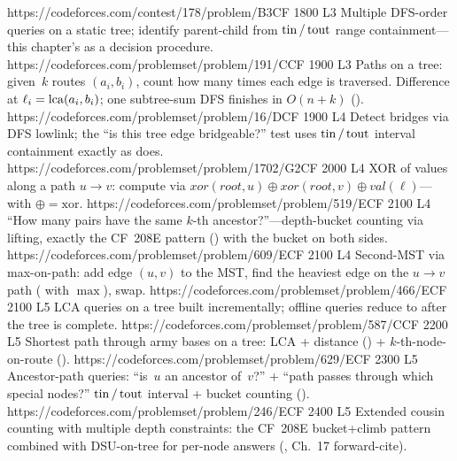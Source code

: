 \begin{mixedset}
    {https://codeforces.com/contest/178/problem/B3}{CF 1800 L3}
    {Multiple DFS-order queries on a static tree; identify parent-child
     from \(\operatorname{tin}/\operatorname{tout}\) range containment---this chapter's
      as a decision procedure.}
    {https://codeforces.com/problemset/problem/191/C}{CF 1900 L3}
    {Paths on a tree: given~\(k\) routes \((a_i,b_i)\), count how many
     times each edge is traversed. Difference at \(\ell_i = \operatorname{lca}(a_i,b_i)\);
     one subtree-sum DFS finishes in \(O(n{+}k)\)
     ().}
    {https://codeforces.com/problemset/problem/16/D}{CF 1900 L4}
    {Detect bridges via DFS lowlink; the ``is this tree edge
     bridgeable?'' test uses \(\operatorname{tin}/\operatorname{tout}\) interval containment
     exactly as  does.}
    {https://codeforces.com/problemset/problem/1702/G2}{CF 2000 L4}
    {XOR of values along a path \(u \to v\): compute via
     \(\mathit{xor}(\mathit{root},u) \oplus
     \mathit{xor}(\mathit{root},v) \oplus \mathit{val}(\ell)\)---
      with \(\oplus = \mathrm{xor}\).}
    {https://codeforces.com/problemset/problem/519/E}{CF 2100 L4}
    {``How many pairs have the same \(k\)-th ancestor?''---depth-bucket
     counting via lifting, exactly the CF~208E pattern
     () with the bucket on both sides.}
    {https://codeforces.com/problemset/problem/609/E}{CF 2100 L4}
    {Second-MST via max-on-path: add edge \((u,v)\) to the MST, find
     the heaviest edge on the \(u \to v\) path ( with
     \(\max\)), swap.}
    {https://codeforces.com/problemset/problem/466/E}{CF 2100 L5}
    {LCA queries on a tree built incrementally; offline queries reduce
     to  after the tree is complete.}
    {https://codeforces.com/problemset/problem/587/C}{CF 2200 L5}
    {Shortest path through army bases on a tree: LCA + distance
     () + \(k\)-th-node-on-route
     ().}
    {https://codeforces.com/problemset/problem/629/E}{CF 2300 L5}
    {Ancestor-path queries: ``is~\(u\) an ancestor of~\(v\)?'' +
     ``path passes through which special nodes?''
     \(\operatorname{tin}/\operatorname{tout}\) interval + bucket counting
     ().}
    {https://codeforces.com/problemset/problem/246/E}{CF 2400 L5}
    {Extended cousin counting with multiple depth constraints: the
     CF~208E bucket+climb pattern combined with DSU-on-tree for
     per-node answers (, Ch.~17 forward-cite).}
\end{mixedset}

